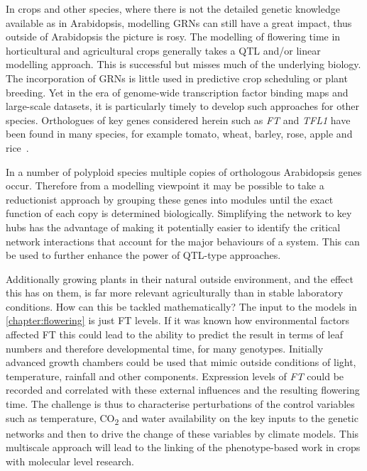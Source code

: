 In crops and other species, where there is not the detailed genetic knowledge available as in Arabidopsis, modelling GRNs can still have a great impact, thus outside of Arabidopsis the picture is rosy.
The modelling of flowering time in horticultural and agricultural crops generally takes a QTL and/or linear modelling approach.
This is successful but misses much of the underlying biology.
The incorporation of GRNs is little used in predictive crop scheduling or plant breeding.
Yet in the era of genome-wide transcription factor binding maps and large-scale datasets, it is particularly timely to develop such approaches for other species.
Orthologues of key genes considered herein such as \emph{FT} and \emph{TFL1} have been found in many species, for example tomato, wheat, barley, rose, apple and rice~\cite{shalit2009, yan2006, randoux2013, mimida2009, tamaki2007}.

In a number of polyploid species multiple copies of orthologous Arabidopsis genes occur.
Therefore from a modelling viewpoint it may be possible to take a reductionist approach by grouping these genes into modules until the exact function of each copy is determined biologically.
Simplifying the network to key hubs has the advantage of making it potentially easier to identify the critical network interactions that account for the major behaviours of a system.
This can be used to further enhance the power of QTL-type approaches.

Additionally growing plants in their natural outside environment, and the effect this has on them, is far more relevant agriculturally than in stable laboratory conditions.
How can this be tackled mathematically?
The input to the models in \autoref{chapter:flowering} is just FT levels.
If it was known how environmental factors affected FT this could lead to the ability to predict the result in terms of leaf numbers and therefore developmental time, for many genotypes.
Initially advanced growth chambers could be used that mimic outside conditions of light, temperature, rainfall and other components.
Expression levels of \emph{FT} could be recorded and correlated with these external influences and the resulting flowering time.
The challenge is thus to characterise perturbations of the control variables such as temperature, CO\textsubscript{2} and water availability on the key inputs to the genetic networks and then to drive the change of these variables by climate models.
This multiscale approach will lead to the linking of the phenotype-based work in crops with molecular level research.


